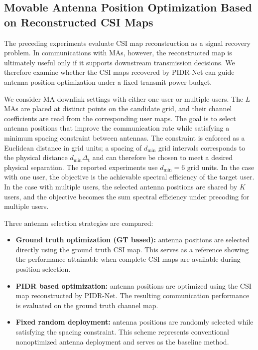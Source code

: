 \documentclass[lettersize,journal]{IEEEtran}
\begin{document}
\subsection{Movable Antenna Position Optimization Based on Reconstructed CSI Maps}
\label{subsec:ma_optimization}

The preceding experiments evaluate CSI map reconstruction as a signal recovery problem. In communications with MAs, however, the reconstructed map is ultimately useful only if it supports downstream transmission decisions. We therefore examine whether the CSI maps recovered by PIDR-Net can guide antenna position optimization under a fixed transmit power budget.

We consider MA downlink settings with either one user or multiple users. The $L$ MAs are placed at distinct points on the candidate grid, and their channel coefficients are read from the corresponding user maps. The goal is to select antenna positions that improve the communication rate while satisfying a minimum spacing constraint between antennas. The constraint is enforced as a Euclidean distance in grid units; a spacing of $d_{\min}$ grid intervals corresponds to the physical distance $d_{\min}\Delta_{\mathrm t}$ and can therefore be chosen to meet a desired physical separation. The reported experiments use $d_{\min}=6$ grid units. In the case with one user, the objective is the achievable spectral efficiency of the target user. In the case with multiple users, the selected antenna positions are shared by $K$ users, and the objective becomes the sum spectral efficiency under precoding for multiple users.

Three antenna selection strategies are compared:

\begin{itemize}
	\item \textbf{Ground truth optimization (GT based):} antenna positions are selected directly using the ground truth CSI map. This serves as a reference showing the performance attainable when complete CSI maps are available during position selection.
	
	\item \textbf{PIDR based optimization:} antenna positions are optimized using the CSI map reconstructed by PIDR-Net. The resulting communication performance is evaluated on the ground truth channel map.
	
	\item \textbf{Fixed random deployment:} antenna positions are randomly selected while satisfying the spacing constraint. This scheme represents conventional nonoptimized antenna deployment and serves as the baseline method.
\end{itemize}
\end{document}
